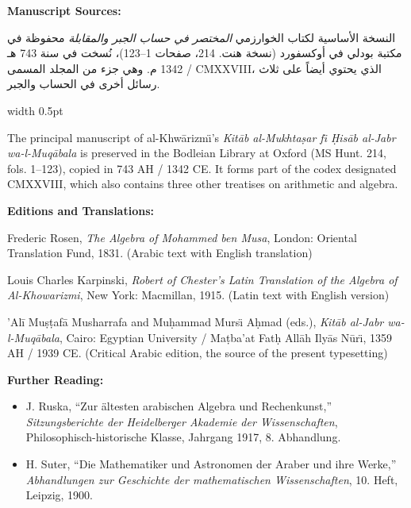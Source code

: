 \documentclass[10pt,a4paper]{book}
\newlength{\colwidth}
\newcommand{\bilingualpair}[2]{%
  \noindent
  \begin{minipage}[t]{\colwidth}
  \begin{flushright}
  \vspace{0pt}
  {\arabicfont\small #1}
  \end{flushright}
  \end{minipage}%
  \hfill\textcolor{columnsepclr}{\vrule width 0.5pt}\hfill
  \begin{minipage}[t]{\colwidth}
  \vspace{0pt}
  {\small #2}
  \end{minipage}%
  \par\vspace{0.6em}
}
\begin{document}
\begin{small}
\textbf{Manuscript Sources:}

\bilingualpair{
النسخة الأساسية لكتاب الخوارزمي \textit{المختصر في حساب الجبر
والمقابلة} محفوظة في مكتبة بودلي في أوكسفورد (نسخة هنت.
214، صفحات 1--123)، نُسخت في سنة 743 هـ / 1342 م. وهي
جزء من المجلد المسمى CMXXVIII، الذي يحتوي أيضاً على ثلاث
رسائل أخرى في الحساب والجبر.
}{
The principal manuscript of al-Khw\=arizm\"{\i}'s \textit{Kit\=ab al-Mukhta\d{s}ar
f\"{\i} \d{H}is\=ab al-Jabr wa-l-Muq\=abala} is preserved in the Bodleian
Library at Oxford (MS Hunt. 214, fols. 1--123), copied in 743 AH / 1342 CE.
It forms part of the codex designated CMXXVIII, which also contains three
other treatises on arithmetic and algebra.
}

\vspace{0.5cm}

\textbf{Editions and Translations:}

\begin{enumerate}[label={[\arabic*]},leftmargin=2em]
  \item Frederic Rosen, \textit{The Algebra of Mohammed ben Musa}, London:
  Oriental Translation Fund, 1831. (Arabic text with English translation)
  
  \item Louis Charles Karpinski, \textit{Robert of Chester's Latin
  Translation of the Algebra of Al-Khowarizmi}, New York: Macmillan, 1915.
  (Latin text with English version)
  
  \item 'Al\=i Mu\d{s}\d{t}af\=a Musharrafa and Mu\d{h}ammad Murs\"{\i} A\d{h}mad
  (eds.), \textit{Kit\=ab al-Jabr wa-l-Muq\=abala}, Cairo: Egyptian
  University / Ma\d{t}ba'at Fat\d{h} All\=ah Ily\=as N\=ur\"{\i}, 1359 AH /
  1939 CE. (Critical Arabic edition, the source of the present typesetting)
\end{enumerate}

\vspace{0.5cm}

\textbf{Further Reading:}

\begin{itemize}[leftmargin=2em]
  \item J. Ruska, ``Zur {\"a}ltesten arabischen Algebra und Rechenkunst,''
  \textit{Sitzungsberichte der Heidelberger Akademie der Wissenschaften},
  Philosophisch-historische Klasse, Jahrgang 1917, 8. Abhandlung.
  
  \item H. Suter, ``Die Mathematiker und Astronomen der Araber und ihre
  Werke,'' \textit{Abhandlungen zur Geschichte der mathematischen
  Wissenschaften}, 10. Heft, Leipzig, 1900.
  

\end{itemize}
\end{small}
\end{document}
